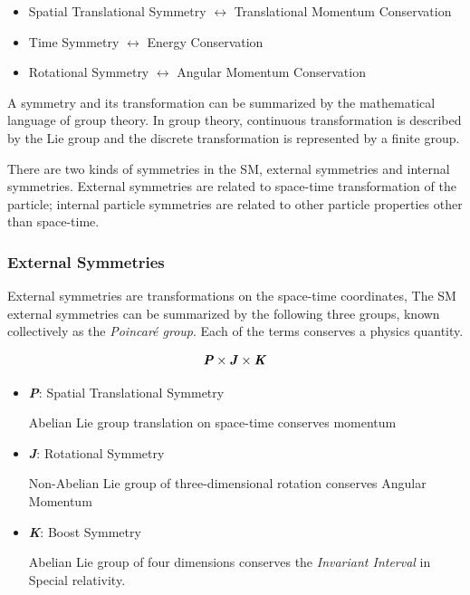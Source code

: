     \begin{itemize}
        \item Spatial Translational Symmetry $\leftrightarrow$ Translational Momentum Conservation
        \item Time Symmetry $\leftrightarrow$ Energy Conservation
        \item Rotational Symmetry $\leftrightarrow$ Angular Momentum Conservation
    \end{itemize}

    A symmetry and its transformation can be summarized by the mathematical language of group theory. In group theory, continuous transformation is described by the Lie group and the discrete transformation is represented by a finite group. 

    There are two kinds of symmetries in the SM, external symmetries and internal symmetries. External symmetries are related to space-time transformation of the particle; internal particle symmetries are related to other particle properties other than space-time. 

\subsubsection{External Symmetries} 
External symmetries are transformations on the space-time coordinates, The SM external symmetries can be summarized by the following three groups, known collectively as the \textit{Poincar\'{e} group}. Each of the terms conserves a physics quantity. 
    
     \begin{equation}
     \textbf{\textit{P}} \times \textbf{\textit{J}} \times \textbf{\textit{K}}
     \end{equation}
     
    \begin{itemize}
        \item \textbf{\textit{P}}: Spatial Translational Symmetry

            Abelian Lie group translation on space-time conserves momentum 
        \item \textbf{\textit{J}}: Rotational Symmetry

            Non-Abelian Lie group of three-dimensional rotation conserves Angular Momentum 
        \item \textbf{\textit{K}}: Boost Symmetry 

            Abelian Lie group of four dimensions conserves the \textit{Invariant Interval} in Special relativity.
    \end{itemize}


